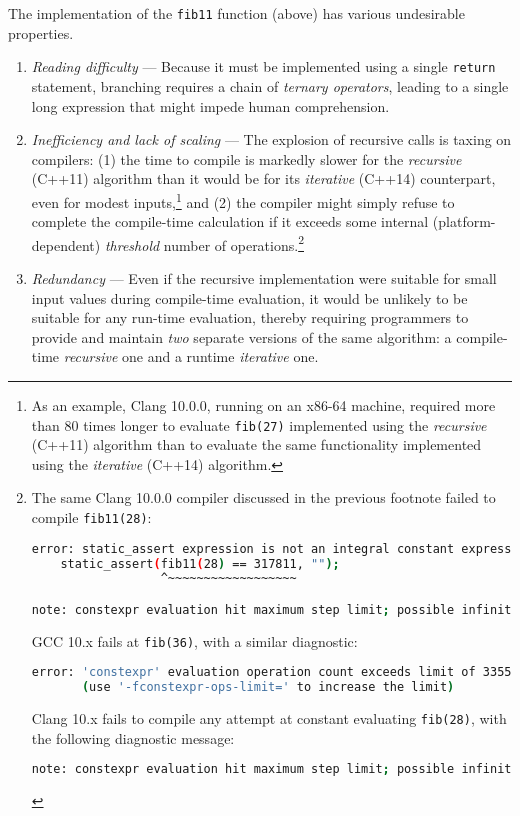\noindent The implementation of the \lstinline!fib11! function (above) has various
undesirable properties.
\begin{enumerate}
\item{\emph{Reading difficulty} — Because it must be implemented using a single \lstinline!return! statement, branching requires a chain of \emph{ternary operators}, leading to a single long expression that might impede human comprehension.}\pagebreak%
\item{\emph{Inefficiency and lack of scaling} — The explosion of recursive calls is taxing on compilers: (1) the time to compile is markedly slower for the \emph{recursive} (C++11) algorithm than it would be for its \emph{iterative} (C++14) counterpart, even for modest inputs,{\cprotect\footnote{As an example, Clang 10.0.0, running on an x86-64 machine, required more than 80 times longer to evaluate \lstinline!fib(27)! implemented using the \emph{recursive} (C++11) algorithm than to evaluate the same functionality implemented using the \emph{iterative} (C++14) algorithm.}} and (2) the compiler might simply refuse to complete the compile-time calculation if it exceeds some internal (platform-dependent) \emph{threshold} number of operations.{\cprotect\footnote{The same Clang 10.0.0 compiler discussed in the previous footnote failed to compile \lstinline!fib11(28)!:

\begin{lstlisting}[language=bash,style=footcodeplain]
error: static_assert expression is not an integral constant expression
    static_assert(fib11(28) == 317811, "");
                  ^~~~~~~~~~~~~~~~~~~

note: constexpr evaluation hit maximum step limit; possible infinite loop?
\end{lstlisting}

\noindent GCC 10.x fails at \lstinline!fib(36)!, with a similar diagnostic:

\begin{lstlisting}[language=bash,style=footcodeplain]
error: 'constexpr' evaluation operation count exceeds limit of 33554432
       (use '-fconstexpr-ops-limit=' to increase the limit)
\end{lstlisting}

\noindent Clang 10.x fails to compile any attempt at constant evaluating \lstinline!fib(28)!, with the following diagnostic \mbox{message}:

\begin{lstlisting}[language=bash,style=footcodeplain]
note: constexpr evaluation hit maximum step limit; possible infinite loop?
\end{lstlisting} 
}} %
} %
\item{\emph{Redundancy} — Even if the recursive implementation were suitable for small input values during compile-time evaluation, it would be unlikely to be suitable for any run-time evaluation, thereby requiring programmers to provide and maintain \emph{two} separate versions of the same algorithm: a compile-time \emph{recursive} one and a runtime \emph{iterative} one.}
\end{enumerate}

